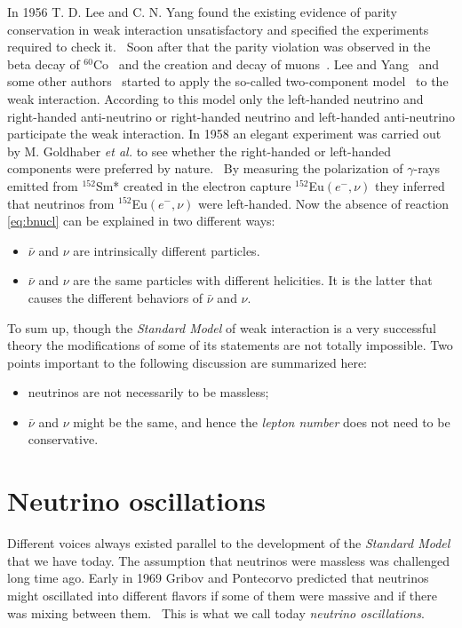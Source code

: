 In 1956 T. D. Lee and C. N. Yang found the existing evidence of parity
conservation in weak interaction unsatisfactory and specified the
experiments required to check it.~\cite{Lee56} Soon after that the
parity violation was observed in the beta decay of
$^{60}$Co~\cite{Wu57} and the creation and decay of
muons~\cite{Gar57,Fri57}. Lee and Yang~\cite{Lee57} and some other
authors~\cite{Sal57,Lan57} started to apply the so-called
two-component model~\cite{Wey29} to the weak interaction. According to
this model only the left-handed neutrino and right-handed
anti-neutrino or right-handed neutrino and left-handed anti-neutrino
participate the weak interaction. In 1958 an elegant experiment was
carried out by M. Goldhaber \textit{et al.} to see whether the
right-handed or left-handed components were preferred by
nature.~\cite{Gol58} By measuring the polarization of $\gamma$-rays
emitted from $^{152}$Sm* created in the electron capture
$^{152}$Eu$(e^-,\nu)$ they inferred that neutrinos from
$^{152}$Eu$(e^-,\nu)$ were left-handed. Now the absence of reaction
\ref{eq:bnucl} can be explained in two different ways:
\begin{itemize}
\item $\bar{\nu}$ and $\nu$ are intrinsically different particles.
\item $\bar{\nu}$ and $\nu$ are the same particles with different
  helicities. It is the latter that causes the different behaviors of
  $\bar{\nu}$ and $\nu$.
\end{itemize}

To sum up, though the \emph{Standard Model} of weak interaction is a
very successful theory the modifications of some of its statements are
not totally impossible. Two points important to the following
discussion are summarized here:
\begin{itemize}
\item neutrinos are not necessarily to be massless;
\item $\bar{\nu}$ and $\nu$ might be the same, and hence the
  \emph{lepton number} does not need to be conservative.
\end{itemize}


\section{Neutrino oscillations}
\label{sec:osci}
Different voices always existed parallel to the development of the
\emph{Standard Model} that we have today. The assumption that
neutrinos were massless was challenged long time ago. Early in 1969
Gribov and Pontecorvo predicted that neutrinos might oscillated into
different flavors if some of them were massive and if there was mixing
between them.~\cite{Gri69} This is what we call today \emph{neutrino
oscillations}.

